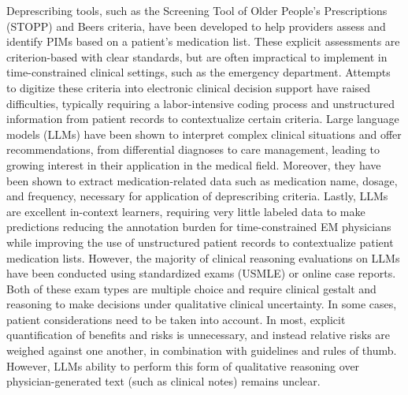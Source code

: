 Deprescribing tools, such as the Screening Tool of Older People’s Prescriptions (STOPP) and Beers criteria, have been developed to help providers assess and identify PIMs based on a patient’s medication list\citep{candeiasPotentiallyInappropriateMedications2021,bythe2023americangeriatricssocietybeerscriteriarupdateexpertpanelAmericanGeriatricsSociety2023,kaufmannInappropriatePrescribingSystematic2014}. These explicit assessments are criterion-based with clear standards, but are often impractical to implement in time-constrained clinical settings, such as the emergency department\citep{leeChallengesOpportunitiesCreating2022}. Attempts to digitize these criteria into electronic clinical decision support have raised difficulties, typically requiring a labor-intensive coding process and unstructured information from patient records to contextualize certain criteria\citep{anrysSTOPPSTARTVersion2016b,scottUsingEMRenabledComputerized2018}. Large language models (LLMs) have been shown to interpret complex clinical situations and offer recommendations, from differential diagnoses to care management, leading to growing interest in their application in the medical field\citep{clusmannFutureLandscapeLarge2023, gilsonHowDoesChatGPT2023, kungPerformanceChatGPTUSMLE2023, savageDiagnosticReasoningPrompts2024}. Moreover, they have been shown to extract medication-related data such as medication name, dosage, and frequency, necessary for application of deprescribing criteria\citep{goelLLMsAccelerateAnnotation2023}. Lastly, LLMs are excellent in-context learners, requiring very little labeled data to make predictions\citep{agrawal-etal-2022-large} reducing the annotation burden for time-constrained EM physicians while improving the use of unstructured patient records to contextualize patient medication lists. However, the majority of clinical reasoning evaluations on LLMs have been conducted using standardized exams (USMLE) or online case reports\citep{savageDiagnosticReasoningPrompts2024, savageLargeLanguageModel2024}. Both of these exam types are multiple choice and require clinical gestalt and reasoning to make decisions under  qualitative clinical uncertainty. In some cases, patient considerations need to be taken into account. In most, explicit quantification of benefits and risks is unnecessary, and instead relative risks are weighed against one another, in combination with guidelines and rules of thumb. However, LLMs ability to perform this form of qualitative reasoning over physician-generated text (such as clinical notes) remains unclear.  

